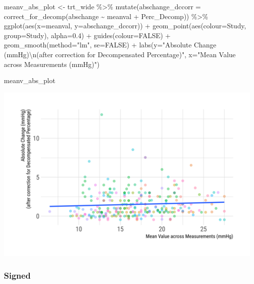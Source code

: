 \documentclass[
]{article}
\newenvironment{Shaded}{\begin{snugshade}}{\end{snugshade}}
\newcommand{\AttributeTok}[1]{\textcolor[rgb]{0.77,0.63,0.00}{#1}}
\newcommand{\ConstantTok}[1]{\textcolor[rgb]{0.00,0.00,0.00}{#1}}
\newcommand{\FloatTok}[1]{\textcolor[rgb]{0.00,0.00,0.81}{#1}}
\newcommand{\FunctionTok}[1]{\textcolor[rgb]{0.00,0.00,0.00}{#1}}
\newcommand{\NormalTok}[1]{#1}
\newcommand{\OtherTok}[1]{\textcolor[rgb]{0.56,0.35,0.01}{#1}}
\newcommand{\SpecialCharTok}[1]{\textcolor[rgb]{0.00,0.00,0.00}{#1}}
\newcommand{\StringTok}[1]{\textcolor[rgb]{0.31,0.60,0.02}{#1}}
\begin{document}
\begin{Shaded}
\begin{Highlighting}[]
\NormalTok{meanv\_abs\_plot }\OtherTok{\textless{}{-}}\NormalTok{ trt\_wide }\SpecialCharTok{\%\textgreater{}\%} 
  \FunctionTok{mutate}\NormalTok{(}\AttributeTok{abschange\_dccorr =} \FunctionTok{correct\_for\_decomp}\NormalTok{(abschange }\SpecialCharTok{\textasciitilde{}}\NormalTok{ meanval }\SpecialCharTok{+}\NormalTok{ Perc\_Decomp)) }\SpecialCharTok{\%\textgreater{}\%} 
  \FunctionTok{ggplot}\NormalTok{(}\FunctionTok{aes}\NormalTok{(}\AttributeTok{x=}\NormalTok{meanval, }\AttributeTok{y=}\NormalTok{abschange\_dccorr)) }\SpecialCharTok{+}
  \FunctionTok{geom\_point}\NormalTok{(}\FunctionTok{aes}\NormalTok{(}\AttributeTok{colour=}\NormalTok{Study, }\AttributeTok{group=}\NormalTok{Study), }\AttributeTok{alpha=}\FloatTok{0.4}\NormalTok{) }\SpecialCharTok{+}
  \FunctionTok{guides}\NormalTok{(}\AttributeTok{colour=}\ConstantTok{FALSE}\NormalTok{) }\SpecialCharTok{+} 
  \FunctionTok{geom\_smooth}\NormalTok{(}\AttributeTok{method=}\StringTok{"lm"}\NormalTok{, }\AttributeTok{se=}\ConstantTok{FALSE}\NormalTok{) }\SpecialCharTok{+}
  \FunctionTok{labs}\NormalTok{(}\AttributeTok{y=}\StringTok{"Absolute Change (mmHg)}\SpecialCharTok{\textbackslash{}n}\StringTok{(after correction for Decompensated Percentage)"}\NormalTok{,}
       \AttributeTok{x=}\StringTok{"Mean Value across Measurements (mmHg)"}\NormalTok{)}

\NormalTok{meanv\_abs\_plot}
\end{Highlighting}
\end{Shaded}

\includegraphics{figures/unnamed-chunk-46-1.png}

\hypertarget{signed-1}{%
\subsubsection{Signed}\label{signed-1}}
\end{document}
